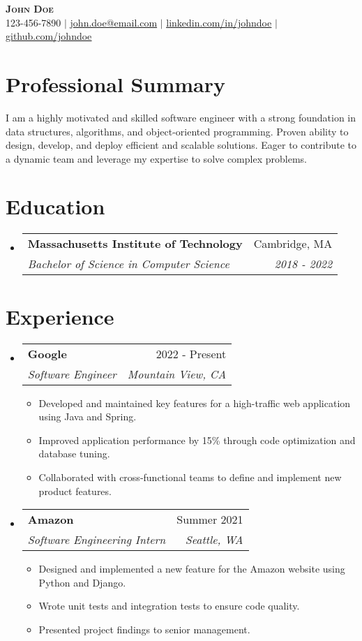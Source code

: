 \documentclass[letterpaper,11pt]{article}
\makeatletter
\newcommand{\resumeItem}[1]{
\item\small{
{#1 \vspace{-2pt}}
}
}
\newcommand{\resumeSubheading}[4]{
\vspace{-2pt}\item
\begin{tabular*}{0.97\textwidth}[t]{l@{\extracolsep{\fill}}r}
\textbf{#1} & #2 \\
\textit{\small#3} & \textit{\small #4} \\
\end{tabular*}\vspace{-7pt}
}
\newcommand{\resumeSubHeadingListStart}{\begin{itemize}[leftmargin=0.15in, label={}]}
\newcommand{\resumeSubHeadingListEnd}{\end{itemize}}
\newcommand{\resumeItemListStart}{\begin{itemize}}
\newcommand{\resumeItemListEnd}{\end{itemize}\vspace{-5pt}}
\makeatother
\begin{document}
\begin{center}
\textbf{\Huge \scshape John Doe} \\ \vspace{1pt}
\small 123-456-7890 $|$ \href{mailto:john.doe@email.com}{\underline{john.doe@email.com}} $|$
\href{https://linkedin.com/in/johndoe}{\underline{linkedin.com/in/johndoe}} $|$
\href{https://github.com/johndoe}{\underline{github.com/johndoe}}
\end{center}


\section{Professional Summary} %
I am a highly motivated and skilled software engineer with a strong foundation in data structures, algorithms, and object-oriented programming. Proven ability to design, develop, and deploy efficient and scalable solutions. Eager to contribute to a dynamic team and leverage my expertise to solve complex problems.

\section{Education}
\resumeSubHeadingListStart
\resumeSubheading{Massachusetts Institute of Technology}{Cambridge, MA}{Bachelor of Science in Computer Science}{2018 - 2022}
\resumeSubHeadingListEnd

\section{Experience}
\resumeSubHeadingListStart
\resumeSubheading{Google}{2022 - Present}{Software Engineer}{Mountain View, CA}
\resumeItemListStart
\resumeItem{Developed and maintained key features for a high-traffic web application using Java and Spring.}
\resumeItem{Improved application performance by 15\% through code optimization and database tuning.}
\resumeItem{Collaborated with cross-functional teams to define and implement new product features.}
\resumeItemListEnd
\resumeSubHeadingListEnd

\resumeSubHeadingListStart
\resumeSubheading{Amazon}{Summer 2021}{Software Engineering Intern}{Seattle, WA}
\resumeItemListStart
\resumeItem{Designed and implemented a new feature for the Amazon website using Python and Django.}
\resumeItem{Wrote unit tests and integration tests to ensure code quality.}
\resumeItem{Presented project findings to senior management.}
\resumeItemListEnd
\resumeSubHeadingListEnd
\end{document}
